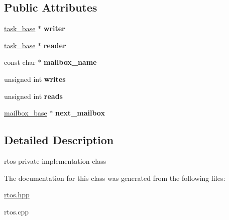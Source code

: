 \subsection*{Public Attributes}
\begin{DoxyCompactItemize}
\item 
\hyperlink{classrtos_1_1task__base}{task\+\_\+base} $\ast$ {\bfseries writer}\hypertarget{classrtos_1_1mailbox__base_ab6916cbb6931c728a256cb59b86a19ad}{}\label{classrtos_1_1mailbox__base_ab6916cbb6931c728a256cb59b86a19ad}

\item 
\hyperlink{classrtos_1_1task__base}{task\+\_\+base} $\ast$ {\bfseries reader}\hypertarget{classrtos_1_1mailbox__base_aacbf86c2dc3d6a3cb19ab3b32a86ead8}{}\label{classrtos_1_1mailbox__base_aacbf86c2dc3d6a3cb19ab3b32a86ead8}

\item 
const char $\ast$ {\bfseries mailbox\+\_\+name}\hypertarget{classrtos_1_1mailbox__base_ad6c99f06c6ae8662b40090040e51f6f5}{}\label{classrtos_1_1mailbox__base_ad6c99f06c6ae8662b40090040e51f6f5}

\item 
unsigned int {\bfseries writes}\hypertarget{classrtos_1_1mailbox__base_a5350e3d0a6d0969c917a630a8255f9f6}{}\label{classrtos_1_1mailbox__base_a5350e3d0a6d0969c917a630a8255f9f6}

\item 
unsigned int {\bfseries reads}\hypertarget{classrtos_1_1mailbox__base_a7d7437c03cca4719cc0c29212c0fc52f}{}\label{classrtos_1_1mailbox__base_a7d7437c03cca4719cc0c29212c0fc52f}

\item 
\hyperlink{classrtos_1_1mailbox__base}{mailbox\+\_\+base} $\ast$ {\bfseries next\+\_\+mailbox}\hypertarget{classrtos_1_1mailbox__base_a3a47e8e62c65ae5f4a0fef12d1bce40b}{}\label{classrtos_1_1mailbox__base_a3a47e8e62c65ae5f4a0fef12d1bce40b}

\end{DoxyCompactItemize}


\subsection{Detailed Description}
rtos private implementation class 

The documentation for this class was generated from the following files\+:\begin{DoxyCompactItemize}
\item 
\hyperlink{rtos_8hpp}{rtos.\+hpp}\item 
rtos.\+cpp\end{DoxyCompactItemize}
